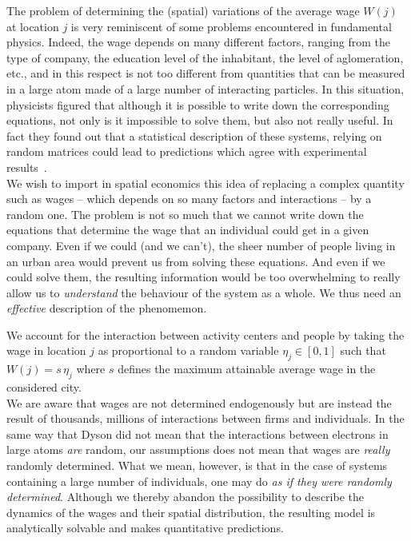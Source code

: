 The problem of determining the (spatial) variations of the average wage $W(j)$
at location $j$ is very reminiscent of some problems encountered in fundamental
physics. Indeed, the wage depends on many different factors, ranging from the
type of company, the education level of the inhabitant, the level of
aglomeration, etc., and in this respect is not too different from quantities
that can be measured in a large atom made of a large number of interacting
particles. In this situation, physicists figured that although it is possible
to write down the corresponding equations, not only is it impossible to solve
them, but also not really useful. In fact they found out that
a statistical description of these systems, relying on random matrices could
lead to predictions which agree with experimental results~\cite{Dyson:1962}.\\

We wish to import in spatial economics this idea of replacing a complex quantity
such as wages -- which depends on so many factors and interactions -- by a random
one. The problem is not so much that we cannot write down the equations that
determine the wage that an individual could get in a given company. Even if we
could (and we can't), the sheer number of people living in an urban area would prevent us
from solving these equations. And even if we could solve them, the resulting
information would be too overwhelming to really allow us to \emph{understand} the
behaviour of the system as a whole. We thus need an \emph{effective}
description of the phenomemon.

We account for the interaction between activity centers and
people by taking the wage in location $j$ as proportional to a random variable
$\eta_j \in \left[ 0,1\right]$ such that $W(j) = s\, \eta_j$ where $s$ defines
the maximum attainable average wage in the considered city.\\

We are aware that wages are not determined endogenously but are instead the
result of thousands, millions of interactions between firms and individuals. In
the same way that Dyson did not mean that the interactions between electrons in
large atoms \emph{are} random, our assumptions does not mean that wages are
\emph{really} randomly determined. What we mean, however, is that in the case of
systems containing a large number of individuals, one may do \emph{as
if they were randomly determined}. Although we thereby abandon the possibility
to describe the dynamics of the wages and their spatial distribution, the
resulting model is analytically solvable and makes quantitative predictions.

